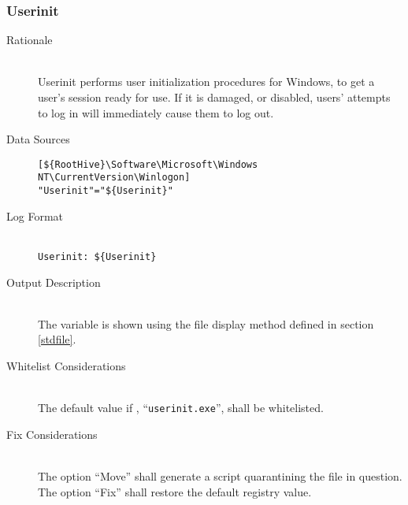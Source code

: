 \subsubsection{Userinit}
\begin{description}
\item[Rationale] \hfill \\
Userinit performs user initialization procedures for Windows, to get a user's
session ready for use. If it is damaged, or disabled, users' attempts to log in
will immediately cause them to log out.
\item[Data Sources] \hfill
\vspace{-\baselineskip}
\begin{verbatim}
[${RootHive}\Software\Microsoft\Windows NT\CurrentVersion\Winlogon]
"Userinit"="${Userinit}"
\end{verbatim}
\item[Log Format] \hfill \\
\verb|Userinit: ${Userinit}|
\item[Output Description] \hfill \\
The variable  is shown using the file display method defined in
section \ref{stdfile}.
\item[Whitelist Considerations] \hfill \\
The default value if , ``\verb|userinit.exe|'', shall be whitelisted.
\item[Fix Considerations] \hfill \\
The option ``Move'' shall generate a script quarantining the file in question.
The option ``Fix'' shall restore the default registry value.
\end{description}

